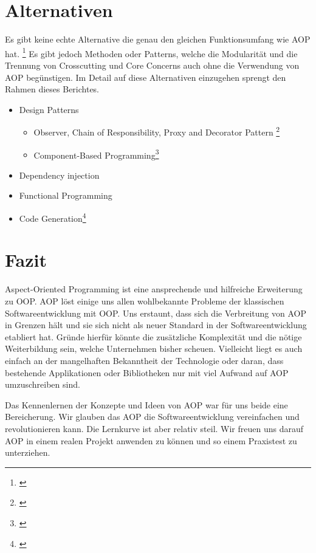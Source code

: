 \section{Alternativen}
Es gibt keine echte Alternative die genau den gleichen Funktionsumfang wie AOP hat. \footnote{\cite{bruce:alternatives}} Es gibt jedoch Methoden oder Patterns, welche die Modularität und die Trennung von Crosscutting und Core Concerns auch ohne die Verwendung von AOP begünstigen. Im Detail auf diese Alternativen einzugehen sprengt den Rahmen dieses Berichtes. 
\begin{itemize}
\item Design Patterns
\begin{itemize}
\item Observer, Chain of Responsibility, Proxy and Decorator Pattern \footnote{\cite[p~66]{laddad:aspectj}}
\item Component-Based Programming\footnote{\cite{wiki:componentbased}} 
\end{itemize}
\item Dependency injection
\item Functional Programming
\item Code Generation\footnote{\cite{aop:alternatives}}
\end{itemize}

\section{Fazit}
Aspect-Oriented Programming ist eine ansprechende und hilfreiche Erweiterung zu OOP. AOP löst einige uns allen wohlbekannte Probleme der klassischen Softwareentwicklung mit OOP. Uns erstaunt, dass sich die Verbreitung von AOP in Grenzen hält und sie sich nicht als neuer Standard in der Softwareentwicklung etabliert hat. Gründe hierfür könnte die zusätzliche Komplexität und die nötige Weiterbildung sein, welche Unternehmen bisher scheuen. Vielleicht liegt es auch einfach an der mangelhaften Bekanntheit der Technologie oder daran, dass bestehende Applikationen oder Bibliotheken nur mit viel Aufwand auf AOP umzuschreiben sind.

Das Kennenlernen der Konzepte und Ideen von AOP war für uns beide eine Bereicherung. Wir glauben das AOP die Softwareentwicklung vereinfachen und revolutionieren kann. Die Lernkurve ist aber relativ steil. Wir freuen uns darauf AOP in einem realen Projekt anwenden zu können und so einem Praxistest zu unterziehen.
